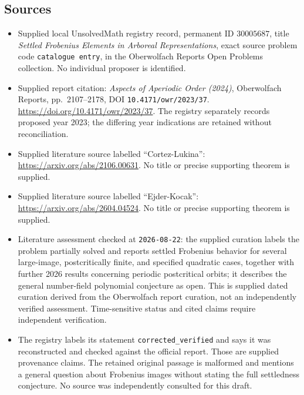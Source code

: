 \documentclass[11pt]{article}
\begin{document}
\subsection{Sources}
\begin{itemize}
\item Supplied local UnsolvedMath registry record, permanent ID \(30005687\), title \emph{Settled Frobenius Elements in Arboreal Representations}, exact source problem code \texttt{catalogue entry}, in the Oberwolfach Reports Open Problems collection. No individual proposer is identified.
\item Supplied report citation: \emph{Aspects of Aperiodic Order (2024)}, Oberwolfach Reports, pp.\ 2107--2178, DOI \texttt{10.4171/owr/2023/37}. \url{https://doi.org/10.4171/owr/2023/37}. The registry separately records proposed year 2023; the differing year indications are retained without reconciliation.
\item Supplied literature source labelled ``Cortez-Lukina'': \url{https://arxiv.org/abs/2106.00631}. No title or precise supporting theorem is supplied.
\item Supplied literature source labelled ``Ejder-Kocak'': \url{https://arxiv.org/abs/2604.04524}. No title or precise supporting theorem is supplied.
\item Literature assessment checked at \texttt{2026-08-22}: the supplied curation labels the problem partially solved and reports settled Frobenius behavior for several large-image, postcritically finite, and specified quadratic cases, together with further 2026 results concerning periodic postcritical orbits; it describes the general number-field polynomial conjecture as open. This is supplied dated curation derived from the Oberwolfach report curation, not an independently verified assessment. Time-sensitive status and cited claims require independent verification.
\item The registry labels its statement \texttt{corrected\_verified} and says it was reconstructed and checked against the official report. Those are supplied provenance claims. The retained original passage is malformed and mentions a general question about Frobenius images without stating the full settledness conjecture. No source was independently consulted for this draft.
\end{itemize}
\end{document}

